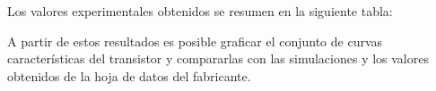     Los valores experimentales obtenidos se resumen en la siguiente tabla:
    
    \begin{table}[H]
    \centering
    \caption{Valores de $I_{DS}$ en función de $V_{DS}$ para distintos valores de $V_{GS}$.}
    \label{tab:ids-vgs}
    \end{table}
    
    A partir de estos resultados es posible graficar el conjunto de curvas características 
    del transistor y compararlas con las simulaciones y los valores obtenidos de la hoja de datos del fabricante.
    
